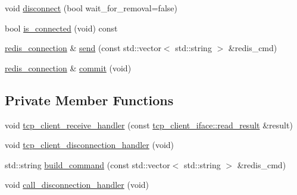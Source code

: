 \begin{DoxyCompactItemize}
\item 
void \hyperlink{classcpp__redis_1_1network_1_1redis__connection_a614a01ce8abd69b44f3d072423d2e696}{disconnect} (bool wait\+\_\+for\+\_\+removal=false)
\item 
bool \hyperlink{classcpp__redis_1_1network_1_1redis__connection_ad3d96826e2e67fb3fed23280237d4d9c}{is\+\_\+connected} (void) const
\item 
\hyperlink{classcpp__redis_1_1network_1_1redis__connection}{redis\+\_\+connection} \& \hyperlink{classcpp__redis_1_1network_1_1redis__connection_a98c163ce431e85e46e139211564b7b3f}{send} (const std\+::vector$<$ std\+::string $>$ \&redis\+\_\+cmd)
\item 
\hyperlink{classcpp__redis_1_1network_1_1redis__connection}{redis\+\_\+connection} \& \hyperlink{classcpp__redis_1_1network_1_1redis__connection_a8e6980d40139877c16e995051b780d60}{commit} (void)
\end{DoxyCompactItemize}
\subsection*{Private Member Functions}
\begin{DoxyCompactItemize}
\item 
void \hyperlink{classcpp__redis_1_1network_1_1redis__connection_a6382aa1f13a25bcccf927476d41968c8}{tcp\+\_\+client\+\_\+receive\+\_\+handler} (const \hyperlink{structcpp__redis_1_1network_1_1tcp__client__iface_1_1read__result}{tcp\+\_\+client\+\_\+iface\+::read\+\_\+result} \&result)
\item 
void \hyperlink{classcpp__redis_1_1network_1_1redis__connection_a9d504600a38af881fdc0757e19a8e753}{tcp\+\_\+client\+\_\+disconnection\+\_\+handler} (void)
\item 
std\+::string \hyperlink{classcpp__redis_1_1network_1_1redis__connection_a67c0343f31981a24dd11e779d20bd5ce}{build\+\_\+command} (const std\+::vector$<$ std\+::string $>$ \&redis\+\_\+cmd)
\item 
void \hyperlink{classcpp__redis_1_1network_1_1redis__connection_a257a6eca9660be3ede989143da38d25b}{call\+\_\+disconnection\+\_\+handler} (void)
\end{DoxyCompactItemize}
